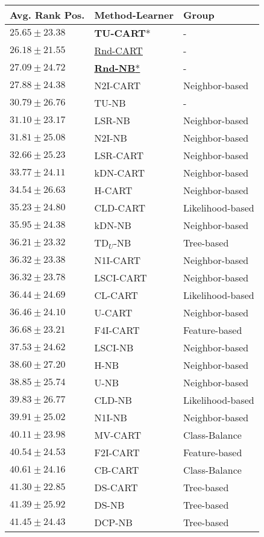 \begin{tabular}{lll}
\toprule
Avg. Rank Pos. & Method-Learner & Group \\
\midrule
$25.65\pm23.38$ & \textbf{TU-CART}* & - \\
$26.18\pm21.55$ & \underline{Rnd-CART} & - \\
$27.09\pm24.72$ & \underline{\textbf{Rnd-NB}*} & - \\
$27.88\pm24.38$ & N2I-CART & Neighbor-based \\
$30.79\pm26.76$ & TU-NB & - \\
$31.10\pm23.17$ & LSR-NB & Neighbor-based \\
$31.81\pm25.08$ & N2I-NB & Neighbor-based \\
$32.66\pm25.23$ & LSR-CART & Neighbor-based \\
$33.77\pm24.11$ & kDN-CART & Neighbor-based \\
$34.54\pm26.63$ & H-CART & Neighbor-based \\
$35.23\pm24.80$ & CLD-CART & Likelihood-based \\
$35.95\pm24.38$ & kDN-NB & Neighbor-based \\
$36.21\pm23.32$ & TD$_U$-NB & Tree-based \\
$36.32\pm23.38$ & N1I-CART & Neighbor-based \\
$36.32\pm23.78$ & LSCI-CART & Neighbor-based \\
$36.44\pm24.69$ & CL-CART & Likelihood-based \\
$36.46\pm24.10$ & U-CART & Neighbor-based \\
$36.68\pm23.21$ & F4I-CART & Feature-based \\
$37.53\pm24.62$ & LSCI-NB & Neighbor-based \\
$38.60\pm27.20$ & H-NB & Neighbor-based \\
$38.85\pm25.74$ & U-NB & Neighbor-based \\
$39.83\pm26.77$ & CLD-NB & Likelihood-based \\
$39.91\pm25.02$ & N1I-NB & Neighbor-based \\
$40.11\pm23.98$ & MV-CART & Class-Balance \\
$40.54\pm24.53$ & F2I-CART & Feature-based \\
$40.61\pm24.16$ & CB-CART & Class-Balance \\
$41.30\pm22.85$ & DS-CART & Tree-based \\
$41.39\pm25.92$ & DS-NB & Tree-based \\
$41.45\pm24.43$ & DCP-NB & Tree-based \\

\end{tabular}
